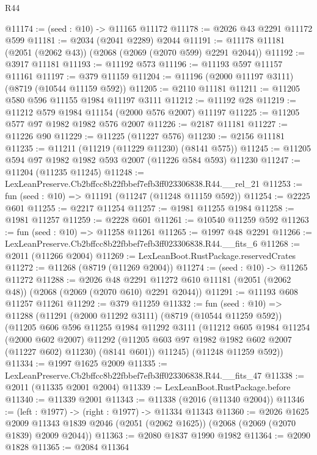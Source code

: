 \begin{lexlean}{R44}
\begin{coremodule}
@11174 := (seed : @10) -> @11165 @11172
@11178 := @2026 @43 @2291 @11172 @599
@11181 := @2034 (@2041 @2289) @2044
@11191 := @11178 @11181 (@2051 (@2062 @43)) (@2068 (@2069 (@2070 @599) @2291 @2044))
@11192 := @3917 @11181
@11193 := @11192 @573
@11196 := @11193 @597 @11157 @11161
@11197 := @379 @11159
@11204 := @11196 (@2000 @11197 @3111) (@8719 (@10544 @11159 @592))
@11205 := @2110 @11181
@11211 := @11205 @580 @596 @11155 @1984 @11197 @3111
@11212 := @11192 @28
@11219 := @11212 @579 @1984 @11154 (@2000 @576 @2007) @11197
@11225 := @11205 @577 @97 @1982 @1982 @576 @2007
@11226 := @2187 @11181
@11227 := @11226 @90
@11229 := @11225 (@11227 @576)
@11230 := @2156 @11181
@11235 := @11211 (@11219 (@11229 @11230) (@8141 @575))
@11245 := @11205 @594 @97 @1982 @1982 @593 @2007 (@11226 @584 @593) @11230
@11247 := @11204 (@11235 @11245)
@11248 := LexLeanPreserve.Cb2bffcc8b22fbbef7efb3ff023306838.R44.__rel_21
@11253 := fun (seed : @10) => @11191 (@11247 (@11248 @11159 @592))
@11254 := @2225 @601
@11255 := @2217 @11254
@11257 := @1981 @11255 @1984
@11258 := @1981 @11257
@11259 := @2228 @601
@11261 := @10540 @11259 @592
@11263 := fun (seed : @10) => @11258 @11261
@11265 := @1997 @48 @2291
@11266 := LexLeanPreserve.Cb2bffcc8b22fbbef7efb3ff023306838.R44.__fits_6
@11268 := @2011 (@11266 @2004)
@11269 := LexLeanBoot.RustPackage.reservedCrates
@11272 := @11268 (@8719 (@11269 @2004))
@11274 := (seed : @10) -> @11265 @11272
@11288 := @2026
    @48
    @2291
    @11272
    @610
    @11181
    (@2051 (@2062 @48))
    (@2068 (@2069 (@2070 @610) @2291 @2044))
@11291 := @11193 @608 @11257 @11261
@11292 := @379 @11259
@11332 := fun (seed : @10) =>
  @11288
    (@11291
      (@2000 @11292 @3111)
      (@8719 (@10544 @11259 @592))
      (@11205
        @606
        @596
        @11255
        @1984
        @11292
        @3111
        (@11212
          @605
          @1984
          @11254
          (@2000 @602 @2007)
          @11292
          (@11205 @603 @97 @1982 @1982 @602 @2007 (@11227 @602) @11230)
          (@8141 @601))
        @11245)
      (@11248 @11259 @592))
@11334 := @1997 @1625 @2009
@11335 := LexLeanPreserve.Cb2bffcc8b22fbbef7efb3ff023306838.R44.__fits_47
@11338 := @2011 (@11335 @2001 @2004)
@11339 := LexLeanBoot.RustPackage.before
@11340 := @11339 @2001
@11343 := @11338 (@2016 (@11340 @2004))
@11346 := (left : @1977) -> (right : @1977) -> @11334 @11343
@11360 := @2026
    @1625
    @2009
    @11343
    @1839
    @2046
    (@2051 (@2062 @1625))
    (@2068 (@2069 (@2070 @1839) @2009 @2044))
@11363 := @2080 @1837 @1990 @1982
@11364 := @2090 @1828
@11365 := @2084 @11364

\end{coremodule}
\end{lexlean}
